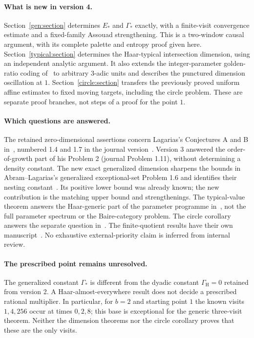\documentclass[11pt]{article}
\theoremstyle{definition}
\theoremstyle{remark}
\begin{document}
\paragraph{What is new in version 4.}
Section~\ref{gen:section} determines $E_*$ and $\Gamma_*$ exactly,
with a finite-visit convergence estimate and a fixed-family Assouad
strengthening. This is a two-window causal argument, with its complete
palette and entropy proof given here.
Section~\ref{typical:section} determines the Haar-typical intersection
dimension, using an independent analytic argument. It also extends
the integer-parameter golden-ratio coding of~\cite{ABL} to arbitrary
$3$-adic units and describes the punctured dimension oscillation at $1$.
Section~\ref{circle:section} transfers the previously proved uniform
affine estimates to fixed moving targets, including the circle problem.
These are separate proof branches, not steps of a proof for the point $1$.

\paragraph{Which questions are answered.}
The retained zero-dimensional assertions concern Lagarias's Conjectures
A and B in~\cite{LagariasArxiv}, numbered 1.4 and 1.7 in the journal
version~\cite{Lagarias}. Version 3 answered the order-of-growth part of
his Problem 2 (journal Problem 1.11), without determining a density
constant. The new exact generalized dimension sharpens the bounds in
Abram--Lagarias's generalized exceptional-set Problem 1.6 and identifies
their nesting constant~\cite{AL2014}. Its positive lower bound was
already known; the new contribution is the matching upper bound and
strengthenings. The typical-value theorem answers the Haar-generic
part of the parameter programme in~\cite[Section 2.4]{AL2014}, not the
full parameter spectrum or the Baire-category problem. The circle
corollary answers the separate question in~\cite[Section 5]{LagariasArxiv}.
The finite-quotient results have their own manuscript~\cite{Quotients}.
No exhaustive external-priority claim is inferred from internal review.

\paragraph{The prescribed point remains unresolved.}
The generalized constant $\Gamma_*$ is different from the dyadic
constant $\Gamma_{\mathrm H}=0$ retained from version 2.
A Haar-almost-everywhere result does not decide a prescribed rational
multiplier. In particular, for $b=2$ and starting point $1$ the known
visits $1,4,256$ occur at times $0,2,8$; this base is exceptional for
the generic three-visit theorem. Neither the dimension theorems nor
the circle corollary proves that these are the only visits.
\end{document}

